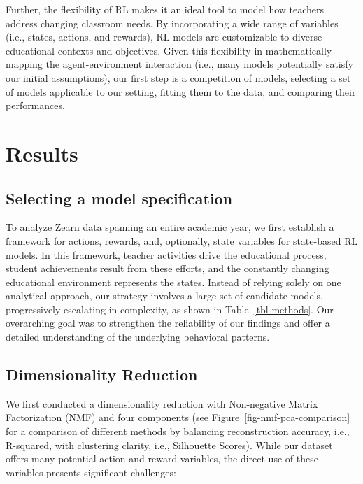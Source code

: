 \documentclass[
  number,
  preprint,
  3p,
  onecolumn]{elsarticle}
\begin{document}
Further, the flexibility of RL makes it an ideal tool to model how
teachers address changing classroom needs. By incorporating a wide range
of variables (i.e., states, actions, and rewards), RL models are
customizable to diverse educational contexts and objectives. Given this
flexibility in mathematically mapping the agent-environment interaction
(i.e., many models potentially satisfy our initial assumptions), our
first step is a competition of models, selecting a set of models
applicable to our setting, fitting them to the data, and comparing their
performances.

\section{Results}\label{results}

\subsection{Selecting a model
specification}\label{selecting-a-model-specification}

To analyze Zearn data spanning an entire academic year, we first
establish a framework for actions, rewards, and, optionally, state
variables for state-based RL models. In this framework, teacher
activities drive the educational process, student achievements result
from these efforts, and the constantly changing educational environment
represents the states. Instead of relying solely on one analytical
approach, our strategy involves a large set of candidate models,
progressively escalating in complexity, as shown in
Table~\ref{tbl-methods}. Our overarching goal was to strengthen the
reliability of our findings and offer a detailed understanding of the
underlying behavioral patterns.

\subsection{Dimensionality Reduction}\label{dimensionality-reduction}

We first conducted a dimensionality reduction with Non-negative Matrix
Factorization (NMF) and four components (see
Figure~\ref{fig-nmf-pca-comparison} for a comparison of different
methods by balancing reconstruction accuracy, i.e., R-squared, with
clustering clarity, i.e., Silhouette Scores). While our dataset offers
many potential action and reward variables, the direct use of these
variables presents significant challenges:
\end{document}
